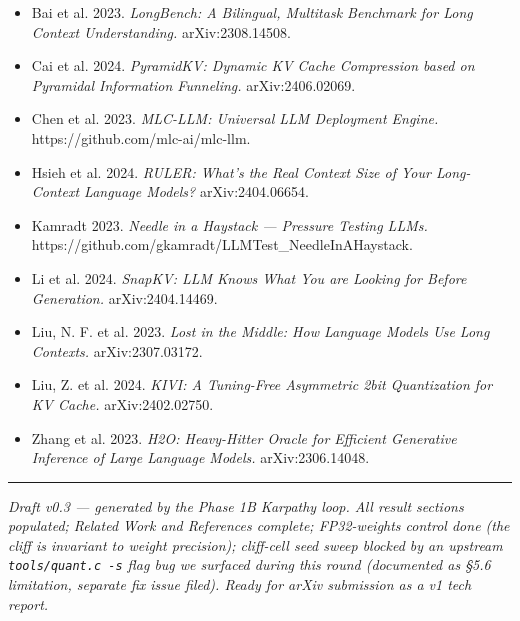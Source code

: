 \documentclass[11pt]{article}
\begin{document}
\begin{itemize}
\item Bai et al. 2023. \textit{LongBench: A Bilingual, Multitask Benchmark for Long Context Understanding.} arXiv:2308.14508.
\item Cai et al. 2024. \textit{PyramidKV: Dynamic KV Cache Compression based on Pyramidal Information Funneling.} arXiv:2406.02069.
\item Chen et al. 2023. \textit{MLC-LLM: Universal LLM Deployment Engine.} https://github.com/mlc-ai/mlc-llm.
\item Hsieh et al. 2024. \textit{RULER: What's the Real Context Size of Your Long-Context Language Models?} arXiv:2404.06654.
\item Kamradt 2023. \textit{Needle in a Haystack — Pressure Testing LLMs.} https://github.com/gkamradt/LLMTest\_NeedleInAHaystack.
\item Li et al. 2024. \textit{SnapKV: LLM Knows What You are Looking for Before Generation.} arXiv:2404.14469.
\item Liu, N. F. et al. 2023. \textit{Lost in the Middle: How Language Models Use Long Contexts.} arXiv:2307.03172.
\item Liu, Z. et al. 2024. \textit{KIVI: A Tuning-Free Asymmetric 2bit Quantization for KV Cache.} arXiv:2402.02750.
\item Zhang et al. 2023. \textit{H2O: Heavy-Hitter Oracle for Efficient Generative Inference of Large Language Models.} arXiv:2306.14048.
\end{itemize}


\medskip\hrule\medskip


\textit{Draft v0.3 — generated by the Phase 1B Karpathy loop. All result sections populated; Related Work and References complete; FP32-weights control done (the cliff is invariant to weight precision); cliff-cell seed sweep blocked by an upstream \texttt{tools/quant.c -s} flag bug we surfaced during this round (documented as §5.6 limitation, separate fix issue filed). Ready for arXiv submission as a v1 tech report.}
\end{document}
